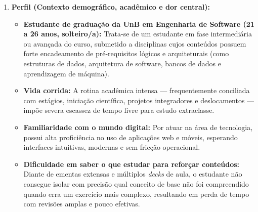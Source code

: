 \begin{enumerate}
    \item \textbf{Perfil (Contexto demográfico, acadêmico e dor central):}
    \begin{itemize}
        \item \textbf{Estudante de graduação da UnB em Engenharia de Software (21 a 26 anos, solteiro/a):} Trata-se de um estudante em fase intermediária ou avançada do curso, submetido a disciplinas cujos conteúdos possuem forte encadeamento de pré-requisitos lógicos e arquiteturais (como estruturas de dados, arquitetura de software, bancos de dados e aprendizagem de máquina).
        \item \textbf{Vida corrida:} A rotina acadêmica intensa — frequentemente conciliada com estágios, iniciação científica, projetos integradores e deslocamentos — impõe severa escassez de tempo livre para estudo extraclasse.
        \item \textbf{Familiaridade com o mundo digital:} Por atuar na área de tecnologia, possui alta proficiência no uso de aplicações web e móveis, esperando interfaces intuitivas, modernas e sem fricção operacional.
        \item \textbf{Dificuldade em saber o que estudar para reforçar conteúdos:} Diante de ementas extensas e múltiplos \textit{decks} de aula, o estudante não consegue isolar com precisão qual conceito de base não foi compreendido quando erra um exercício mais complexo, resultando em perda de tempo com revisões amplas e pouco efetivas.
    \end{itemize}


\end{enumerate}
